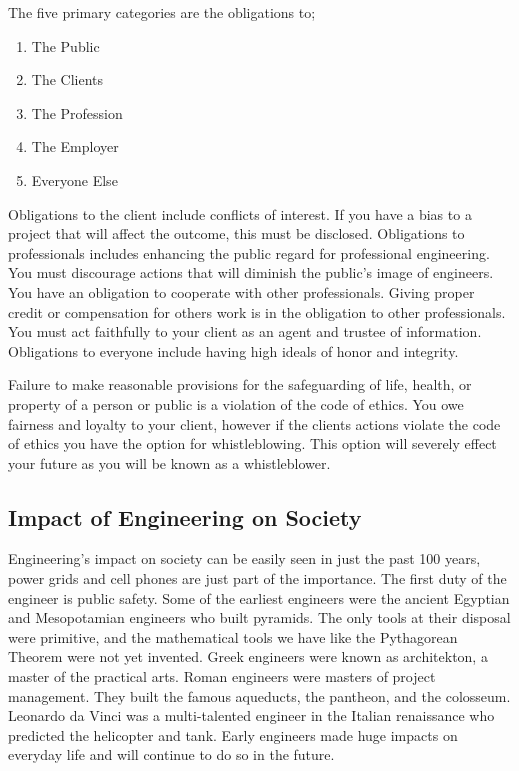 \documentclass[12pt,a4paper]{report}
\begin{document}
    The five primary categories are the obligations to;
    
    \begin{enumerate}
        \item The Public
        \item The Clients
        \item The Profession
        \item The Employer
        \item Everyone Else
    \end{enumerate}
    
    Obligations to the client include conflicts of interest. If you have a bias to a project that will affect the outcome, this must be disclosed. Obligations to professionals includes enhancing the public regard for professional engineering. You must discourage actions that will diminish the public’s image of engineers. You have an obligation to cooperate with other professionals. Giving proper credit or compensation for others work is in the obligation to other professionals.  You must act faithfully to your client as an agent and trustee of information. Obligations to everyone include having high ideals of honor and integrity.
    \par
    
    Failure to make reasonable provisions for the safeguarding of life, health, or property of a person or public is a violation of the code of ethics. You owe fairness and loyalty to your client, however if the clients actions violate the code of ethics you have the option for whistleblowing. This option will severely effect your future as you will be known as a whistleblower.
    
    
\subsection{Impact of Engineering on Society}

 Engineering’s impact on society can be easily seen in just the past 100 years, power grids and cell phones are just part of the importance. The first duty of the engineer is public safety. Some of the earliest engineers were the ancient Egyptian and Mesopotamian engineers who built pyramids. The only tools at their disposal were primitive, and the mathematical tools we have like the Pythagorean Theorem were not yet invented. Greek engineers were known as architekton, a master of the practical arts. Roman engineers were masters of project management. They built the famous aqueducts, the pantheon, and the colosseum. Leonardo da Vinci was a multi-talented engineer in the Italian renaissance who predicted the helicopter and tank. Early engineers made huge impacts on everyday life and will continue to do so in the future. \par
\end{document}
